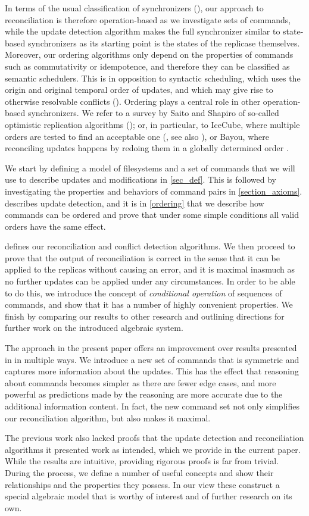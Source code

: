In terms of the usual classification of synchronizers (\cite{TSR, PV, SSH}),
our approach to reconciliation is therefore operation-based as we investigate sets of commands,
while the update detection algorithm makes the full synchronizer 
similar to state-based synchronizers 
as its starting point is the states of the replicase themselves.
Moreover, our ordering algorithms only depend on the properties of commands 
such as commutativity or idempotence,
and therefore they can be classified as semantic schedulers.
This is in opposition to syntactic scheduling, which uses 
the origin and original temporal order of updates, 
and which may give rise to otherwise resolvable conflicts (\cite{SSH}).
Ordering plays a central role in other operation-based synchronizers.
We refer to a survey by Saito and Shapiro of so-called optimistic replication algorithms (\cite{SSH});
or, in particular,
to IceCube, where multiple orders are tested to find an acceptable one (\cite{KRSD}, see also \cite{MPV}),
or Bayou, where reconciling updates happens by redoing them in a globally determined order \cite{TTPDSH}.

We start by defining a model of filesystems and a set of commands
that we will use to describe updates and modifications in \cref{sec_def}.
This is followed by investigating the properties and behaviors
of command pairs in \cref{section_axioms}.
 describes update detection, and it is
in \cref{ordering} that we describe how commands can be ordered
and prove that under some simple conditions all valid orders
have the same effect.

 defines our reconciliation 
and conflict detection algorithms.
We then proceed to prove that the output of reconciliation
is correct in the sense that 
it can be applied to the replicas without causing an error,
and it is maximal
inasmuch as no further updates can be applied under any circumstances.
In order to be able to do this, we introduce
the concept of \emph{conditional operation} of sequences of commands,
and show that it has a number of highly convenient properties.
We finish by comparing our results to other research
and outlining directions for further work
on the introduced algebraic system.

The approach in the present paper offers an improvement
over results presented in \cite{NREC} in multiple ways.
We introduce a new set of commands that is symmetric and
captures more information about the updates.
This has the effect that reasoning about commands
becomes simpler as there are fewer edge cases,
and more powerful as 
predictions made by the reasoning are more accurate
due to the additional information content.
In fact, the new command set not only simplifies
our reconciliation algorithm, but also makes it maximal.

The previous work also lacked proofs that the update detection
and reconciliation algorithms it presented work as intended,
which we provide in the current paper.
While the results are intuitive, providing rigorous proofs
is far from trivial.
During the process, we define a number of useful concepts
and show their relationships and the properties they possess.
In our view these construct a special algebraic model
that is worthy of interest and of further research on its own.

